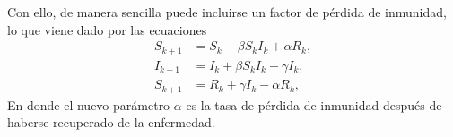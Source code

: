 Con ello, de manera sencilla puede incluirse un factor de pérdida de inmunidad, lo que viene dado por las ecuaciones
\begin{equation}
    \begin{aligned}
    S_{k+1} &= S_k -\beta S_k I_k + \alpha R_k, \\
    I_{k+1} &= I_k + \beta S_k I_k - \gamma I_k, \\
    S_{k+1} &= R_k + \gamma I_k - \alpha R_k,
    \end{aligned}
    \label{eq:SIR_rec}
\end{equation}
En donde el nuevo parámetro $\alpha$ es la tasa de pérdida de inmunidad después de haberse recuperado de la enfermedad.